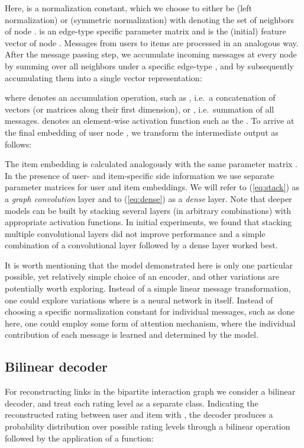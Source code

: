 \documentclass[twoside]{article}
\begin{document}
Here,  is a normalization constant, which we choose to either be  (left normalization) or  (symmetric normalization) with
  denoting the set of neighbors of node .  is an edge-type specific parameter matrix and  is the (initial) feature vector of node . Messages  from users to items are processed in an analogous way. After the message passing step, we accumulate incoming messages at every node by summing over all neighbors  under a specific edge-type , and by subsequently accumulating them into a single vector representation:

where  denotes an accumulation operation, such as , i.e.~a concatenation of vectors (or matrices along their first dimension), or , i.e.~summation of all messages.  denotes an element-wise activation function such as the . To arrive at the final embedding of user node , we transform the intermediate output  as follows:

The item embedding  is calculated analogously with the same parameter matrix . In the presence of user- and item-specific side information we use separate parameter matrices for user and item embeddings. We will refer to (\ref{eq:stack}) as a \textit{graph convolution} layer and to (\ref{eq:dense}) as a \textit{dense} layer. Note that deeper models can be built by stacking several layers (in arbitrary combinations) with appropriate activation functions. In initial experiments, we found that stacking multiple convolutional layers did not improve performance and a simple combination of a convolutional layer followed by a dense layer worked best.

It is worth mentioning that the model demonstrated here is only one particular possible, yet relatively simple choice of an encoder, and other variations are potentially worth exploring. Instead of a simple linear message transformation, one could explore variations where  is a neural network in itself. Instead of choosing a specific normalization constant for individual messages, such as done here, one could employ some form of attention mechanism, where the individual contribution of each message is learned and determined by the model.

\subsection{Bilinear decoder}
For reconstructing links in the bipartite interaction graph we consider a bilinear decoder, and treat each rating level as a separate class. Indicating the reconstructed rating between user  and item  with , the decoder produces a probability distribution over possible rating levels through a bilinear operation followed by the application of a  function:
\end{document}

